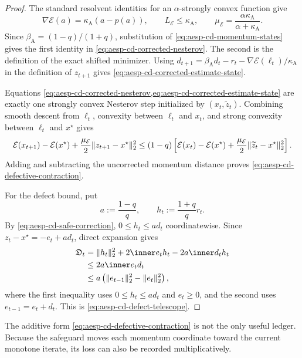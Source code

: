 \begin{proof}
The standard resolvent identities for an $\alpha$-strongly convex function
give
\begin{equation*}
 \nabla\mathcal E(a)
 =\kappa_{\mathrm A}(a-p(a)),
 \qquad
 L_{\mathcal E}\leq\kappa_{\mathrm A},
 \qquad
 \mu_{\mathcal E}
 =\frac{\alpha\kappa_{\mathrm A}}
        {\alpha+\kappa_{\mathrm A}}.
\end{equation*}
Since
$\beta_{\mathrm A}=(1-q)/(1+q)$, substitution of
\cref{eq:aesp-cd-momentum-states} gives the first identity in
\cref{eq:aesp-cd-corrected-nesterov}.  The second is the definition of the
exact shifted minimizer.  Using
$d_{t+1}=\beta_{\mathrm A}d_t-r_t
-\nabla\mathcal E(\ell_t)/\kappa_{\mathrm A}$ in the definition of
$z_{t+1}$ gives \cref{eq:aesp-cd-corrected-estimate-state}.

Equations
\cref{eq:aesp-cd-corrected-nesterov,eq:aesp-cd-corrected-estimate-state}
are exactly one strongly convex Nesterov step initialized by
$(x_t,\widetilde z_t)$.  Combining smooth descent from $\ell_t$, convexity
between $\ell_t$ and $x_t$, and strong convexity between $\ell_t$ and
$x^\star$ gives
\begin{equation*}
 \mathcal E(x_{t+1})-\mathcal E(x^\star)
 +\frac{\mu_{\mathcal E}}2\lVert z_{t+1}-x^\star\rVert_2^2
 \leq(1-q)\left[
 \mathcal E(x_t)-\mathcal E(x^\star)
 +\frac{\mu_{\mathcal E}}2
       \lVert\widetilde z_t-x^\star\rVert_2^2
 \right].
\end{equation*}
Adding and subtracting the uncorrected momentum distance proves
\cref{eq:aesp-cd-defective-contraction}.

For the defect bound, put
\begin{equation*}
 a:=\frac{1-q}{q},
 \qquad
 h_t:=\frac{1+q}{q}r_t.
\end{equation*}
By \cref{eq:aesp-cd-safe-correction},
$0\leq h_t\leq a d_t$ coordinatewise.  Since
$z_t-x^\star=-e_t+ad_t$, direct expansion gives
\begin{align*}
 \mathfrak D_t
 &=\norm{h_t}_2^2+2\ip{e_t}{h_t}
    -2a\ip{d_t}{h_t}\\
 &\leq2a\ip{e_t}{d_t}\\
 &\leq a\left(\norm{e_{t-1}}_2^2-\norm{e_t}_2^2\right),
\end{align*}
where the first inequality uses $0\leq h_t\leq ad_t$ and $e_t\geq0$, and the
second uses $e_{t-1}=e_t+d_t$.  This is
\cref{eq:aesp-cd-defect-telescope}.
\end{proof}

The additive form \cref{eq:aesp-cd-defective-contraction} is not the only
useful ledger.  Because the safeguard moves each momentum coordinate toward
the current monotone iterate, its loss can also be recorded multiplicatively.

